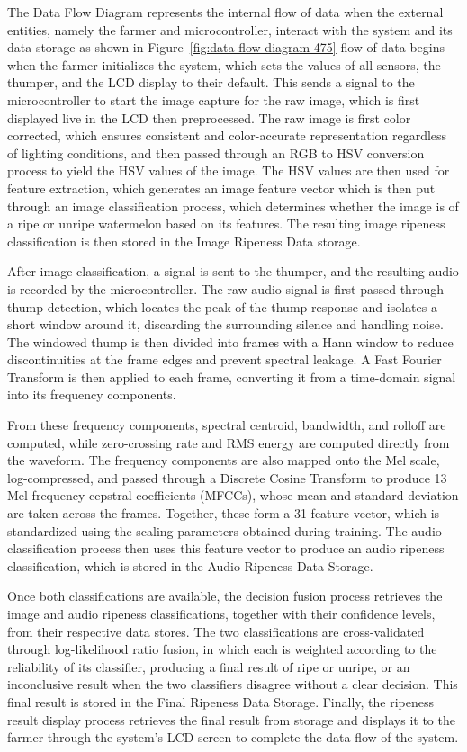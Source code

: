 \begin{thesisprose}
The Data Flow Diagram represents the internal flow of data when the external entities, namely the farmer and microcontroller, interact with the system and its data storage as shown in Figure~\ref{fig:data-flow-diagram-475} flow of data begins when the farmer initializes the system, which sets the values of all sensors, the thumper, and the LCD display to their default. This sends a signal to the microcontroller to start the image capture for the raw image, which is first displayed live in the LCD then preprocessed. The raw image is first color corrected, which ensures consistent and color-accurate representation regardless of lighting conditions, and then passed through an RGB to HSV conversion process to yield the HSV values of the image. The HSV values are then used for feature extraction, which generates an image feature vector which is then put through an image classification process, which determines whether the image is of a ripe or unripe watermelon based on its features. The resulting image ripeness classification is then stored in the Image Ripeness Data storage.

After image classification, a signal is sent to the thumper, and the resulting audio is recorded by the microcontroller. The raw audio signal is first passed through thump detection, which locates the peak of the thump response and isolates a short window around it, discarding the surrounding silence and handling noise. The windowed thump is then divided into frames with a Hann window to reduce discontinuities at the frame edges and prevent spectral leakage. A Fast Fourier Transform is then applied to each frame, converting it from a time-domain signal into its frequency components.

From these frequency components, spectral centroid, bandwidth, and rolloff are computed, while zero-crossing rate and RMS energy are computed directly from the waveform. The frequency components are also mapped onto the Mel scale, log-compressed, and passed through a Discrete Cosine Transform to produce 13 Mel-frequency cepstral coefficients (MFCCs), whose mean and standard deviation are taken across the frames. Together, these form a 31-feature vector, which is standardized using the scaling parameters obtained during training. The audio classification process then uses this feature vector to produce an audio ripeness classification, which is stored in the Audio Ripeness Data Storage.

Once both classifications are available, the decision fusion process retrieves the image and audio ripeness classifications, together with their confidence levels, from their respective data stores. The two classifications are cross-validated through log-likelihood ratio fusion, in which each is weighted according to the reliability of its classifier, producing a final result of ripe or unripe, or an inconclusive result when the two classifiers disagree without a clear decision. This final result is stored in the Final Ripeness Data Storage. Finally, the ripeness result display process retrieves the final result from storage and displays it to the farmer through the system’s LCD screen to complete the data flow of the system.


\end{thesisprose}
